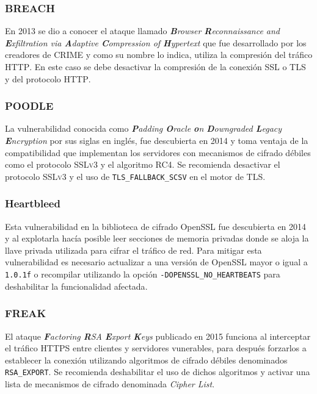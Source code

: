         \subsubsection{BREACH}

En 2013 se dio a conocer el ataque llamado \emph{\textbf{B}rowser \textbf{R}econnaissance and \textbf{E}xfiltration via \textbf{A}daptive \textbf{C}ompression of \textbf{H}ypertext} que fue desarrollado por los creadores de \textsc{CRIME} y como su nombre lo indica, utiliza la compresi\'{o}n del tr\'{a}fico \textsc{HTTP}. En este caso se debe desactivar la compresi\'{o}n de la conexi\'{o}n \textsc{SSL} o \textsc{TLS} y del protocolo \textsc{HTTP}\cite{_breach_????}.

        \subsubsection{POODLE}

La vulnerabilidad conocida como \emph{\textbf{P}adding \textbf{O}racle \textbf{o}n \textbf{D}owngraded \textbf{L}egacy \textbf{E}ncryption} por sus siglas en ingl\'{e}s, fue descubierta en 2014 y toma ventaja de la compatibilidad que implementan los servidores con mecanismos de cifrado d\'{e}biles como el protocolo \textsc{SSLv3} y el algoritmo \textsc{RC4}. Se recomienda desactivar el protocolo \textsc{SSLv3} y el uso de \texttt{TLS\_FALLBACK\_SCSV} en el motor de \textsc{TLS}\cite{_ssl-poodle.pdf_????}.

        \subsubsection{Heartbleed}

Esta vulnerabilidad en la biblioteca de cifrado OpenSSL fue descubierta en 2014 y al explotarla hac\'{i}a posible leer secciones de memoria privadas donde se aloja la llave privada utilizada para cifrar el tr\'{a}fico de red\cite{_heartbleed_????}. Para mitigar esta vulnerabilidad es necesario actualizar a una versi\'{o}n de OpenSSL mayor o igual a \texttt{1.0.1f} o recompilar utilizando la opci\'{o}n \texttt{-DOPENSSL\_NO\_HEARTBEATS} para deshabilitar la funcionalidad afectada\cite{_vulnerabilidad_????}.

        \subsubsection{FREAK}

El ataque \emph{\textbf{F}actoring \textbf{R}SA \textbf{E}xport \textbf{K}eys} publicado en 2015 funciona al interceptar el tr\'{a}fico \textsc{HTTPS} entre clientes y servidores vunerables, para despu\'{e}s forzarlos a establecer la conexi\'{o}n utilizando algoritmos de cifrado d\'{e}biles denominados \texttt{RSA\_EXPORT}. Se recomienda deshabilitar el uso de dichos algoritmos y activar una lista de mecanismos de cifrado denominada \emph{Cipher List}\cite{_tracking_????}.

